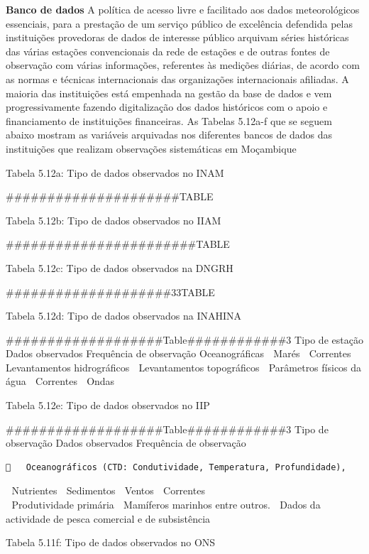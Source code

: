 \documentclass[
]{book}
\begin{document}
\textbf{Banco de dados}
A política de acesso livre e facilitado aos dados meteorológicos essenciais, para a prestação de um serviço público de excelência defendida pelas instituições provedoras de dados de interesse público arquivam séries históricas das várias estações convencionais da rede de estações e de outras fontes de observação com várias informações, referentes às medições diárias, de acordo com as normas e técnicas internacionais das organizações internacionais afiliadas. A maioria das instituições está empenhada na gestão da base de dados e vem progressivamente fazendo digitalização dos dados históricos com o apoio e financiamento de instituições financeiras. As Tabelas 5.12a-f que se seguem abaixo mostram as variáveis arquivadas nos diferentes bancos de dados das instituições que realizam observações sistemáticas em Moçambique

Tabela 5.12a: Tipo de dados observados no INAM

\#\#\#\#\#\#\#\#\#\#\#\#\#\#\#\#\#\#\#\#\#TABLE

Tabela 5.12b: Tipo de dados observados no IIAM

\#\#\#\#\#\#\#\#\#\#\#\#\#\#\#\#\#\#\#\#\#\#\#TABLE

Tabela 5.12c: Tipo de dados observados na DNGRH

\#\#\#\#\#\#\#\#\#\#\#\#\#\#\#\#\#\#\#\#33TABLE

Tabela 5.12d: Tipo de dados observados na INAHINA

\#\#\#\#\#\#\#\#\#\#\#\#\#\#\#\#\#\#\#Table\#\#\#\#\#\#\#\#\#\#\#\#3
Tipo de estação Dados observados Frequência de observação
Oceanográficas  Marés
 Correntes
 Levantamentos hidrográficos
 Levantamentos topográficos
 Parâmetros físicos da água
 Correntes
 Ondas

Tabela 5.12e: Tipo de dados observados no IIP

\#\#\#\#\#\#\#\#\#\#\#\#\#\#\#\#\#\#\#Table\#\#\#\#\#\#\#\#\#\#\#\#3
Tipo de observação Dados observados Frequência de observação

\begin{verbatim}
   Oceanográficos (CTD: Condutividade, Temperatura, Profundidade), 
\end{verbatim}

 Nutrientes
 Sedimentos
 Ventos
 Correntes\\
 Produtividade primária
 Mamíferos marinhos entre outros.
 Dados da actividade de pesca comercial e de subsistência

Tabela 5.11f: Tipo de dados observados no ONS
\end{document}
